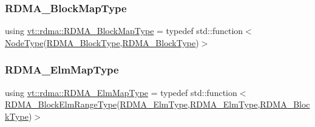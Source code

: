 \mbox{\label{namespacevt_1_1rdma_a049e294a5236ad30692253d5f82886c9}} 
\subsubsection{\texorpdfstring{R\+D\+M\+A\+\_\+\+Block\+Map\+Type}{RDMA\_BlockMapType}}
{\footnotesize\ttfamily using \hyperlink{namespacevt_1_1rdma_a049e294a5236ad30692253d5f82886c9}{vt\+::rdma\+::\+R\+D\+M\+A\+\_\+\+Block\+Map\+Type} = typedef std\+::function$<$\hyperlink{namespacevt_a866da9d0efc19c0a1ce79e9e492f47e2}{Node\+Type}(\hyperlink{namespacevt_ae54d2ca8f6bb4d65faf65118c82cd6f7}{R\+D\+M\+A\+\_\+\+Block\+Type},\hyperlink{namespacevt_ae54d2ca8f6bb4d65faf65118c82cd6f7}{R\+D\+M\+A\+\_\+\+Block\+Type})$>$}

\mbox{\label{namespacevt_1_1rdma_a6798ab36a5dcb8749c25dff719f9ce07}} 
\subsubsection{\texorpdfstring{R\+D\+M\+A\+\_\+\+Elm\+Map\+Type}{RDMA\_ElmMapType}}
{\footnotesize\ttfamily using \hyperlink{namespacevt_1_1rdma_a6798ab36a5dcb8749c25dff719f9ce07}{vt\+::rdma\+::\+R\+D\+M\+A\+\_\+\+Elm\+Map\+Type} = typedef std\+::function$<$\hyperlink{namespacevt_1_1rdma_a8320f97b4a2866df60d9778486dbcd0f}{R\+D\+M\+A\+\_\+\+Block\+Elm\+Range\+Type}(\hyperlink{namespacevt_a2c2a902092b72056f70210c159f966f0}{R\+D\+M\+A\+\_\+\+Elm\+Type},\hyperlink{namespacevt_a2c2a902092b72056f70210c159f966f0}{R\+D\+M\+A\+\_\+\+Elm\+Type},\hyperlink{namespacevt_ae54d2ca8f6bb4d65faf65118c82cd6f7}{R\+D\+M\+A\+\_\+\+Block\+Type})$>$}

\mbox{\label{namespacevt_1_1rdma_a09c31fc860965bddd7a22f6adceb96fd}} 
